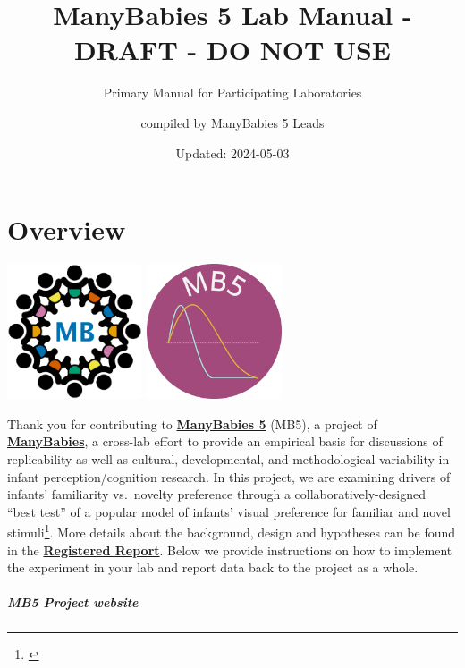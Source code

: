 \documentclass[
]{book}
\title{ManyBabies 5 Lab Manual - DRAFT - DO NOT USE}
\subtitle{Primary Manual for Participating Laboratories}
\author{compiled by ManyBabies 5 Leads}
\date{Updated: 2024-05-03}
\begin{document}
\maketitle

{
\setcounter{tocdepth}{1}
\tableofcontents
}
\hypertarget{overview}{%
\chapter*{Overview}\label{overview}}

\includegraphics[width=0.3\textwidth,height=\textheight]{images/mb-logo.png} \includegraphics[width=0.3\textwidth,height=\textheight]{images/mb5-logo.png}

Thank you for contributing to \href{https://manybabies.org/MB5/}{\textbf{ManyBabies 5}} (MB5), a project of \href{https://manybabies.org/}{\textbf{ManyBabies}}, a cross-lab effort to provide an empirical basis for discussions of replicability as well as cultural, developmental, and methodological variability in infant perception/cognition research. In this project, we are examining drivers of infants' familiarity vs.~novelty preference through a collaboratively-designed ``best test'' of a popular model of infants' visual preference for familiar and novel stimuli\footnote{\citet{hunterames}}. More details about the background, design and hypotheses can be found in the \href{https://osf.io/preprints/psyarxiv/ck3vd}{\textbf{Registered Report}}. Below we provide instructions on how to implement the experiment in your lab and report data back to the project as a whole.

\hypertarget{mb5-project-website}{%
\paragraph*{MB5 Project website}\label{mb5-project-website}}
\end{document}
